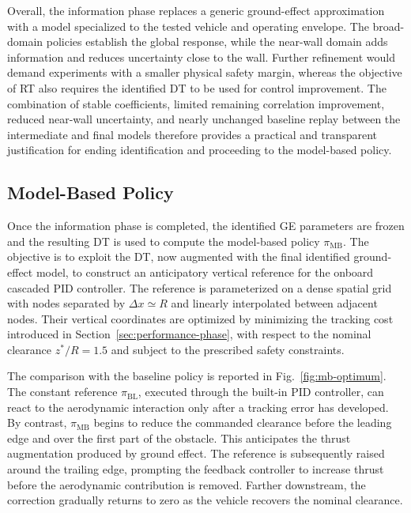 \documentclass[journal]{IEEEtran}
\begin{document}
Overall, the information phase replaces a generic ground-effect approximation with a model specialized to the tested vehicle and operating envelope. The broad-domain policies establish the global response, while the near-wall domain adds information and reduces uncertainty close to the wall. Further refinement would demand experiments with a smaller physical safety margin, whereas the objective of RT also requires the identified DT to be used for control improvement. The combination of stable coefficients, limited remaining correlation improvement, reduced near-wall uncertainty, and nearly unchanged baseline replay between the intermediate and final models therefore provides a practical and transparent justification for ending identification and proceeding to the model-based policy.

\subsection{Model-Based Policy}
\label{sec:results-mb}

Once the information phase is completed, the identified GE parameters are frozen and the resulting DT is used to compute the model-based policy $\pi_{\mathrm{MB}}$. The objective is to exploit the DT, now augmented with the final identified ground-effect model, to construct an anticipatory vertical reference for the onboard cascaded PID controller. The reference is parameterized on a dense spatial grid with nodes separated by $\Delta x\simeq R$ and linearly interpolated between adjacent nodes. Their vertical coordinates are optimized by minimizing the tracking cost introduced in Section~\ref{sec:performance-phase}, with respect to the nominal clearance $z^\ast/R=1.5$ and subject to the prescribed safety constraints.

The comparison with the baseline policy is reported in Fig.~\ref{fig:mb-optimum}. The constant reference $\pi_{\mathrm{BL}}$, executed through the built-in PID controller, can react to the aerodynamic interaction only after a tracking error has developed. By contrast, $\pi_{\mathrm{MB}}$ begins to reduce the commanded clearance before the leading edge and over the first part of the obstacle. This anticipates the thrust augmentation produced by ground effect. The reference is subsequently raised around the trailing edge, prompting the feedback controller to increase thrust before the aerodynamic contribution is removed. Farther downstream, the correction gradually returns to zero as the vehicle recovers the nominal clearance.
\end{document}
